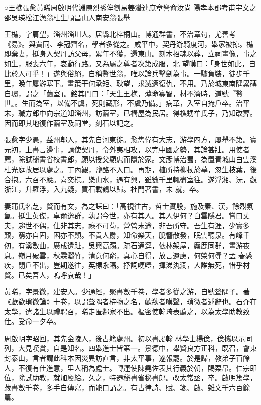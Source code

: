 
\begin{pinyinscope}

 ○王樵張愈黃晞周啟明代淵陳烈孫侔劉易姜潛連庶章詧俞汝尚
 陽孝本鄧考甫宇文之邵吳瑛松江漁翁杜生順昌山人南安翁張舉



 王樵，字肩望，淄州淄川人。居縣北梓桐山。博通群書，不治章句，尤善考《易》。與賈同、李冠齊名，學者多從之。咸平中，契丹游騎度河，舉家被掠。樵即棄妻，挺身入契丹訪父母，累年不獲，還東山。刻木招魂以葬，立祠畫像，事之如生，服喪六年，哀動行路。又為屬之尊者次第成服，北
 望嘆曰：「身世如此，自比於人可乎！」遂與俗絕，自稱贅世翁，唯以論兵擊劍為事。一驢負裝，徒步千里，晚年屢游塞下。畫策干何承矩、耿望，求滅遼復仇，不用。乃於城東南隅累磚自環，謂之「繭室」。銘其門曰：「天生王樵，薄命寡智，材不濟時，道號『贅世』。生而為室，以備不虞，死則藏形，不虞乃備。」病革，入室自掩戶卒。治平末，職方郎中向宗道知淄州，訪繭室，已構屋為民居。得樵甥牟氏子，乃知改葬。因而即其地復作繭室及祠堂，刻石以記之。



 張愈字少愚，益州郫人，其先自河東徙。愈雋偉有大志，游學四方，屢舉不第。寶元初，上書言邊事，請使契丹，令外夷相攻，以完中國之勢，其論甚壯。用使者薦，除試秘書省校書郎，願以授父顯忠而隱於家。文彥博治蜀，為置青城山白雲溪杜光庭故居以處之。丁內艱，鹽酪不入口。再期，植所持柳杖於墓，忽生枝葉，後合抱。六召不應。喜奕棋。樂山水，遇有興，雖數千里輒盡室往。遂浮湘、沅，觀浙江，升羅浮，入九疑，買石載鶴以歸。杜門著書，未
 就，卒。



 妻蒲氏名芝，賢而有文，為之誄曰：「高視往古，哲士實殷，施及秦、漢，餘烈氛氳。挺生英傑，卓爾逸群，孰謂今世，亦有其人。其人伊何？白雲隱君。嘗曰丈夫，趨世不偶，仕非其志，祿不可茍，營營末途，非吾所守。吾生有涯，少實多艱，窮亦自固，困亦不顛。不貴人爵，知命樂天，脫簪散發，眠雲聽泉。有峰千仞，有溪數曲，廣成遺趾，吳興高躅。疏石通逕，依林架屋，麋鹿同群，晝游夜息。嶺月破雲，秋霖灑竹，清意何窮，真心自得，放言遺慮，何榮何辱？孟
 春感疾，閉戶不出，豈期遂往，英標永隔。抒詞哽噎，揮涕汍瀾，人誰無死，惜乎材賢。已矣吾人，嗚呼哀哉！」



 黃晞，字景微，建安人。少通經，聚書數千卷，學者多從之游，自號聱隅子。著《歔欷瑣微論》十卷，以謂聱隅者枿物之名，歔欷者嘆聲，瑣微者述辭也。石介在太學，遣諸生以禮聘召，晞走匿鄰家不出。樞密使韓琦表薦之，以為太學助教致仕。受命一夕卒。



 周啟明字昭回，其先金陵人，後占籍處州。初以書謁翰
 林學士楊億，億攜以示同列，大見嘆賞，自是知名。四舉進士皆第一。景德中，舉賢良方正科，既召，會東封泰山，言者謂此科本因災異訪直言，非太平事，遂報罷。於是歸，教弟子百餘人，不復有仕進意，里人稱為處士。轉運使陳堯佐表其行義於朝，賜粟帛。仁宗即位，除試助教，就加廩給。久之，特遷秘書省秘書郎。改太常丞，卒。啟明篤學，藏書數千卷，多手自傳寫，而能口誦之。有古律詩、賦、箋、啟、雜文千六百餘篇。




\end{pinyinscope}
